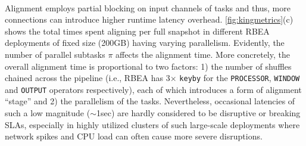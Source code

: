  \\
Alignment employs partial blocking on input channels of tasks and thus, more connections can introduce higher runtime latency overhead. \autoref{fig:kingmetrics}(c) shows the total times spent aligning per full snapshot in different RBEA deployments of fixed size (200GB) having varying parallelism. Evidently, the number of parallel subtasks $\pi$ affects the alignment time. More concretely, the overall alignment time is proportional to two factors: 1) the number of shuffles chained across the pipeline (i.e., RBEA has 3$\times$ \texttt{keyby} for the \texttt{PROCESSOR}, \texttt{WINDOW} and \texttt{OUTPUT} operators respectively), each of which introduces a form of alignment ``stage'' and 2) the parallelism of the tasks. Nevertheless, occasional latencies of such a low magnitude ($\sim$1sec) are hardly considered to be disruptive or breaking SLAs, especially in highly utilized clusters of such large-scale deployments where network spikes and CPU load can often cause more severe disruptions.



